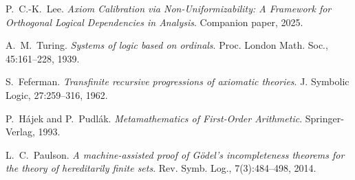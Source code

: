 \documentclass[11pt]{article}
\begin{document}
\begin{thebibliography}{10}

P.~C.-K.~Lee.
\emph{Axiom Calibration via Non-Uniformizability: A Framework for Orthogonal Logical Dependencies in Analysis}.
Companion paper, 2025.

A.~M.~Turing.
\emph{Systems of logic based on ordinals}.
Proc. London Math. Soc., 45:161--228, 1939.

S.~Feferman.
\emph{Transfinite recursive progressions of axiomatic theories}.
J. Symbolic Logic, 27:259--316, 1962.

P.~Hájek and P.~Pudlák.
\emph{Metamathematics of First-Order Arithmetic}.
Springer-Verlag, 1993.

L.~C.~Paulson.
\emph{A machine-assisted proof of Gödel's incompleteness theorems for the theory of hereditarily finite sets}.
Rev. Symb. Log., 7(3):484--498, 2014.

\end{thebibliography}
\end{document}
